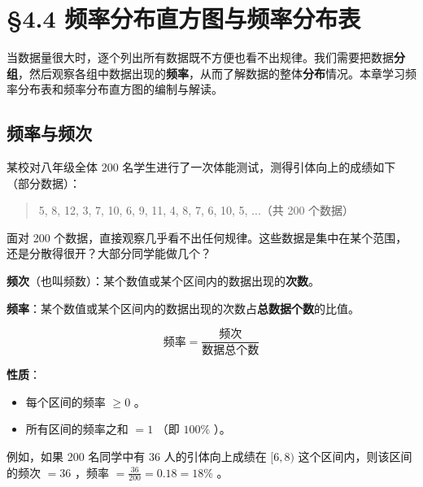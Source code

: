 \chapter{§4.4 频率分布直方图与频率分布表}
\label{sec:4.4}





当数据量很大时，逐个列出所有数据既不方便也看不出规律。我们需要把数据\textbf{分组}，然后观察各组中数据出现的\textbf{频率}，从而了解数据的整体\textbf{分布}情况。本章学习频率分布表和频率分布直方图的编制与解读。



\section*{频率与频次}


\begin{explore}


某校对八年级全体 200 名学生进行了一次体能测试，测得引体向上的成绩如下（部分数据）：

\end{explore}

\begin{quote}
5, 8, 12, 3, 7, 10, 6, 9, 11, 4, 8, 7, 6, 10, 5, ...（共 200 个数据）
\end{quote}


面对 200 个数据，直接观察几乎看不出任何规律。这些数据是集中在某个范围，还是分散得很开？大部分同学能做几个？

\begin{understand}


\textbf{频次}（也叫频数）：某个数值或某个区间内的数据出现的\textbf{次数}。

\textbf{频率}：某个数值或某个区间内的数据出现的次数占\textbf{总数据个数}的比值。

\[
\text{频率} = \frac{\text{频次}}{\text{数据总个数}}
\]


\textbf{性质}：
\begin{itemize}
  \item 每个区间的频率 $\geq 0$ 。
  \item 所有区间的频率之和 $= 1$ （即 $100\%$ ）。
\end{itemize}


例如，如果 200 名同学中有 36 人的引体向上成绩在 $[6, 8)$ 这个区间内，则该区间的频次 $= 36$ ，频率 $= \frac{36}{200} = 0.18 = 18\%$ 。

\end{understand}

